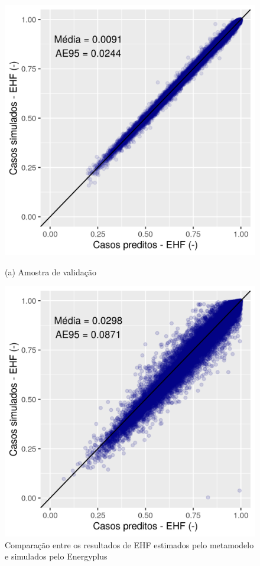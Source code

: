 \documentclass[brazil,hardcopy,openany]{ufscthesis} %
\begin{document}
\begin{figure}[h]
	\caption{Comparação entre os resultados de EHF estimados pelo metamodelo e simulados pelo Energyplus}
	\begin{minipage}{.5\textwidth}
		\centering
		\includegraphics[width=1\linewidth]{img/ann_validation.png}
		\begin{center}
			\small{(a) Amostra de validação}
		\end{center}
	\end{minipage}%
	\begin{minipage}{.5\textwidth}
		\centering
		\includegraphics[width=1\linewidth]{img/ann_test.png}

\end{minipage}
\end{figure}
\end{document}
